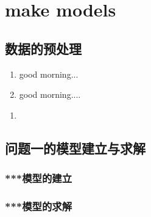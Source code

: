 \newpage	
\section{make models}
\subsection{数据的预处理}


\begin{enumerate}[
	label = (\arabic*),
	itemindent = 0pt,
	labelindent = \parindent,
	labelwidth = 2em,
	labelsep = 5pt,
	leftmargin = 4.5em
	]
	\item[$Step$ 1:] good morning...
	\item[$Step$ 2:] good morning....
\end{enumerate}

\begin{enumerate}
	\item 
\end{enumerate}

\subsection{问题一的模型建立与求解}
\subsubsection{***模型的建立}


\subsubsection{***模型的求解}


